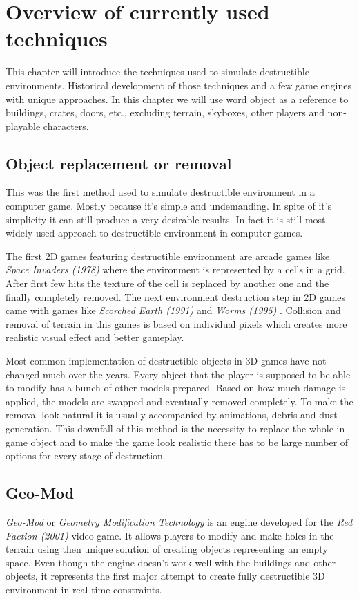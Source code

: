 \chapter{Overview of currently used techniques}
This chapter will introduce the techniques used to simulate destructible environments. Historical development of those techniques and a few game engines with unique approaches. In this chapter we will use word object as a reference to buildings, crates, doors, etc., excluding terrain, skyboxes, other players and non-playable characters.

\section{Object replacement or removal}
This was the first method used to simulate destructible environment in a computer game. Mostly because it's simple and undemanding. In spite of it's simplicity it can still produce a very desirable results. In fact it is still most widely used approach to destructible environment in computer games.

The first 2D games featuring destructible environment are arcade games like \emph{Space Invaders (1978)} \cite{invaders} where the environment is represented by a cells in a grid. After first few hits the texture of the cell is replaced by another one and the finally completely removed. The next environment destruction step in 2D games came with games like \emph{Scorched Earth (1991)} \cite{scorched} and \emph{Worms (1995)} \cite{worms}. Collision and removal of terrain in this games is based on individual pixels which creates more realistic visual effect and better gameplay.

Most common implementation of destructible objects in 3D games have not changed much over the years. Every object that the player is supposed to be able to modify has a bunch of other models prepared. Based on how much damage is applied, the models are swapped and eventually removed completely. To make the removal look natural it is usually accompanied by animations, debris and dust generation. This downfall of this method is the necessity to replace the whole in-game object and to make the game look realistic there has to be large number of options for every stage of destruction.

\section{Geo-Mod}
\emph{Geo-Mod} \cite{geomod} or \emph{Geometry Modification Technology} is an engine developed for the \emph{Red Faction (2001)} \cite{redfaction} video game. It allows players to modify and make holes in the terrain using then unique solution of creating objects representing an empty space. Even though the engine doesn't work well with the buildings and other objects, it represents the first major attempt to create fully destructible 3D environment in real time constraints.

